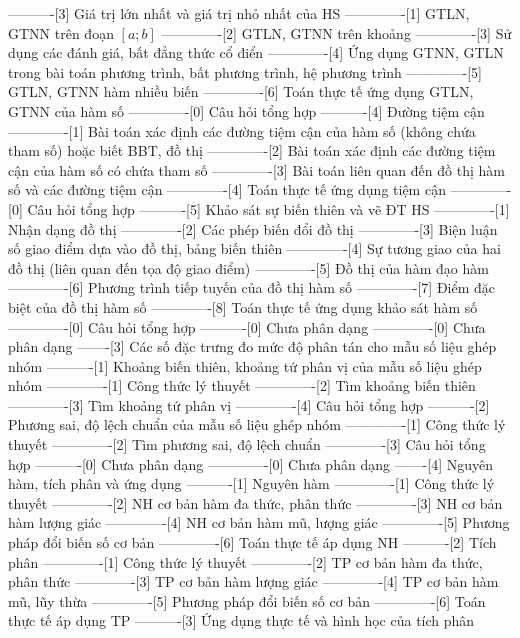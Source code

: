 ----------[3] Giá trị lớn nhất và giá trị nhỏ nhất của HS
-------------[1] GTLN, GTNN trên đoạn $[a;b]$
-------------[2] GTLN, GTNN trên khoảng
-------------[3] Sử dụng các đánh giá, bất đẳng thức cổ điển
-------------[4] Ứng dụng GTNN, GTLN trong bài toán phương trình, bất phương trình, hệ phương trình
-------------[5] GTLN, GTNN hàm nhiều biến
-------------[6] Toán thực tế ứng dụng GTLN, GTNN của hàm số
-------------[0] Câu hỏi tổng hợp
----------[4] Đường tiệm cận
-------------[1] Bài toán xác định các đường tiệm cận của hàm số (không chứa tham số) hoặc biết BBT, đồ thị
-------------[2] Bài toán xác định các đường tiệm cận của hàm số có chứa tham số
-------------[3] Bài toán liên quan đến đồ thị hàm số và các đường tiệm cận
-------------[4] Toán thực tế ứng dụng tiệm cận
-------------[0] Câu hỏi tổng hợp
----------[5] Khảo sát sự biến thiên và vẽ ĐT HS
-------------[1] Nhận dạng đồ thị
-------------[2] Các phép biến đổi đồ thị
-------------[3] Biện luận số giao điểm dựa vào đồ thị, bảng biến thiên
-------------[4] Sự tương giao của hai đồ thị (liên quan đến tọa độ giao điểm)
-------------[5] Đồ thị của hàm đạo hàm
-------------[6] Phương trình tiếp tuyến của đồ thị hàm số
-------------[7] Điểm đặc biệt của đồ thị hàm số
-------------[8] Toán thực tế ứng dụng khảo sát hàm số
-------------[0] Câu hỏi tổng hợp
----------[0] Chưa phân dạng
-------------[0] Chưa phân dạng
-------[3] Các số đặc trưng đo mức độ phân tán cho mẫu số liệu ghép nhóm
----------[1] Khoảng biến thiên, khoảng tứ phân vị của mẫu số liệu ghép nhóm
-------------[1] Công thức lý thuyết
-------------[2] Tìm khoảng biến thiên 
-------------[3] Tìm khoảng tứ phân vị
-------------[4] Câu hỏi tổng hợp
----------[2] Phương sai, độ lệch chuẩn của mẫu số liệu ghép nhóm
-------------[1] Công thức lý thuyết
-------------[2] Tìm phương sai, độ lệch chuẩn
-------------[3] Câu hỏi tổng hợp
----------[0] Chưa phân dạng
-------------[0] Chưa phân dạng
-------[4] Nguyên hàm, tích phân và ứng dụng
----------[1] Nguyên hàm
-------------[1] Công thức lý thuyết
-------------[2] NH cơ bản hàm đa thức, phân thức
-------------[3] NH cơ bản hàm lượng giác
-------------[4] NH cơ bản hàm mũ, lượng giác
-------------[5] Phương pháp đổi biến số cơ bản
-------------[6] Toán thực tế áp dụng NH
----------[2] Tích phân
-------------[1] Công thức lý thuyết
-------------[2] TP cơ bản hàm đa thức, phân thức
-------------[3] TP cơ bản hàm lượng giác
-------------[4] TP cơ bản hàm mũ, lũy thừa
-------------[5] Phương pháp đổi biến số cơ bản
-------------[6] Toán thực tế áp dụng TP
----------[3] Ứng dụng thực tế và hình học của tích phân
